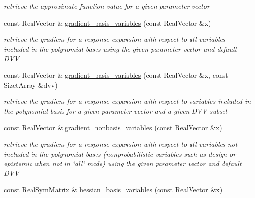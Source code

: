 \begin{DoxyCompactItemize}
\begin{DoxyCompactList}\small\item\em retrieve the approximate function value for a given parameter vector \end{DoxyCompactList}\item 
const Real\+Vector \& \hyperlink{classPecos_1_1HierarchInterpPolyApproximation_ae3b6ea541392b74cf0cc8758e206277c}{gradient\+\_\+basis\+\_\+variables} (const Real\+Vector \&x)\label{classPecos_1_1HierarchInterpPolyApproximation_ae3b6ea541392b74cf0cc8758e206277c}

\begin{DoxyCompactList}\small\item\em retrieve the gradient for a response expansion with respect to all variables included in the polynomial bases using the given parameter vector and default D\+VV \end{DoxyCompactList}\item 
const Real\+Vector \& \hyperlink{classPecos_1_1HierarchInterpPolyApproximation_a3ffb563ae1658344bfc2ad882def9e7c}{gradient\+\_\+basis\+\_\+variables} (const Real\+Vector \&x, const Sizet\+Array \&dvv)\label{classPecos_1_1HierarchInterpPolyApproximation_a3ffb563ae1658344bfc2ad882def9e7c}

\begin{DoxyCompactList}\small\item\em retrieve the gradient for a response expansion with respect to variables included in the polynomial basis for a given parameter vector and a given D\+VV subset \end{DoxyCompactList}\item 
const Real\+Vector \& \hyperlink{classPecos_1_1HierarchInterpPolyApproximation_a518e8604f973a4b161a9b5718a0aa25e}{gradient\+\_\+nonbasis\+\_\+variables} (const Real\+Vector \&x)\label{classPecos_1_1HierarchInterpPolyApproximation_a518e8604f973a4b161a9b5718a0aa25e}

\begin{DoxyCompactList}\small\item\em retrieve the gradient for a response expansion with respect to all variables not included in the polynomial bases (nonprobabilistic variables such as design or epistemic when not in \char`\"{}all\char`\"{} mode) using the given parameter vector and default D\+VV \end{DoxyCompactList}\item 
const Real\+Sym\+Matrix \& \hyperlink{classPecos_1_1HierarchInterpPolyApproximation_a830729654265d84af637960f8c63f2bc}{hessian\+\_\+basis\+\_\+variables} (const Real\+Vector \&x)\label{classPecos_1_1HierarchInterpPolyApproximation_a830729654265d84af637960f8c63f2bc}


\end{DoxyCompactItemize}
